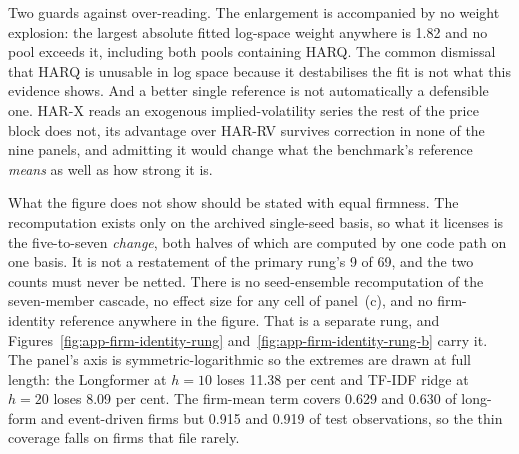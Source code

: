 Two guards against over-reading. The enlargement is accompanied by no weight
explosion: the largest absolute fitted log-space weight anywhere is 1.82
and no pool exceeds it, including both pools containing HARQ. %
The common
dismissal that HARQ is unusable in log space because it destabilises the fit is
not what this evidence shows.
And a better single reference is not automatically a defensible one. HAR-X
reads an exogenous implied-volatility series the rest of the price block does
not, its advantage over HAR-RV survives correction in none of the nine panels,
and admitting it would change what the benchmark's reference \emph{means} as
well as how strong it is.

What the figure does not show should be stated with equal firmness. The
recomputation exists only on the archived single-seed basis, so what it
licenses is the five-to-seven \emph{change}, both halves of which are computed
by one code path on one basis. It is not a restatement of the primary rung's
9 of 69, and the two counts must never be netted. There is no seed-ensemble
recomputation of the seven-member cascade, no effect size for any cell of
panel~(c), and no firm-identity reference anywhere in the figure. That is a
separate rung, and Figures~\ref{fig:app-firm-identity-rung} and~\ref{fig:app-firm-identity-rung-b} carry it. The panel's axis is symmetric-logarithmic so the extremes are drawn at full length: the Longformer at $h=10$ loses 11.38 per cent and TF-IDF ridge at $h=20$ loses 8.09 per cent.
The firm-mean term covers 0.629 and 0.630 of long-form and event-driven firms but 0.915 and 0.919 of test observations, so the thin coverage falls on firms that file rarely.

